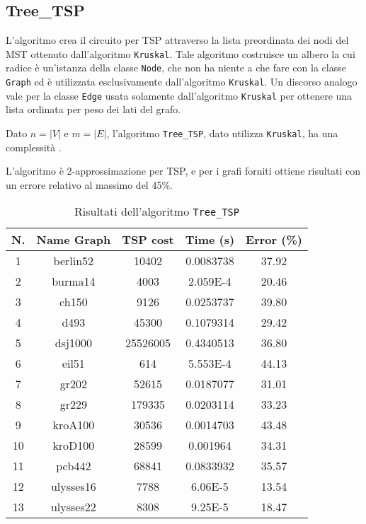 \subsection{Tree\_TSP}

L'algoritmo crea il circuito per TSP attraverso la lista preordinata dei nodi del MST ottenuto dall'algoritmo \texttt{Kruskal}. Tale algoritmo costruisce un albero la cui radice è un'istanza della classe \texttt{Node}, che non ha niente a che fare con la classe \texttt{Graph} ed è utilizzata esclusivamente dall'algoritmo \texttt{Kruskal}. Un discorso analogo vale per la classe \texttt{Edge} usata solamente dall'algoritmo \texttt{Kruskal} per ottenere una lista ordinata per peso dei lati del grafo.

Dato $n=|V|$ e $m=|E|$, l'algoritmo \texttt{Tree\_TSP}, dato utilizza \texttt{Kruskal}, ha una complessità .

L'algoritmo è 2-approssimazione per TSP, e per i grafi forniti ottiene risultati con un errore relativo al massimo del 45\%.   

\begin{table}[H]
	\centering
	\begin{tabular}{|c|c|c|c|c|}
		\hline
		\textbf{N.} & \textbf{Name Graph} & \textbf{TSP cost} & \textbf{Time (s)} & \textbf{Error (\%)}\\ 
		\hline
		1 & berlin52 & 10402 & 0.0083738 & 37.92\\
		\hline
		2 & burma14 & 4003 & 2.059E-4 & 20.46\\
		\hline
		3 & ch150 & 9126 & 0.0253737 & 39.80\\
		\hline
		4 & d493 & 45300 & 0.1079314 & 29.42\\
		\hline
		5 & dsj1000 & 25526005 & 0.4340513 & 36.80\\
		\hline
		6 & eil51 & 614 & 5.553E-4 & 44.13\\
		\hline
		7 & gr202 & 52615 & 0.0187077 & 31.01\\
		\hline
		8 & gr229 & 179335 & 0.0203114 & 33.23\\
		\hline
		9 & kroA100 & 30536 & 0.0014703 & 43.48\\
		\hline
		10 & kroD100 & 28599 & 0.001964 & 34.31\\
		\hline
		11 & pcb442 & 68841 & 0.0833932 & 35.57\\
		\hline
		12 & ulysses16 & 7788 & 6.06E-5 & 13.54\\
		\hline
		13 & ulysses22 & 8308 & 9.25E-5 & 18.47\\
		\hline
	\end{tabular}
	\caption{Risultati dell'algoritmo \texttt{Tree\_TSP}}
\end{table}


